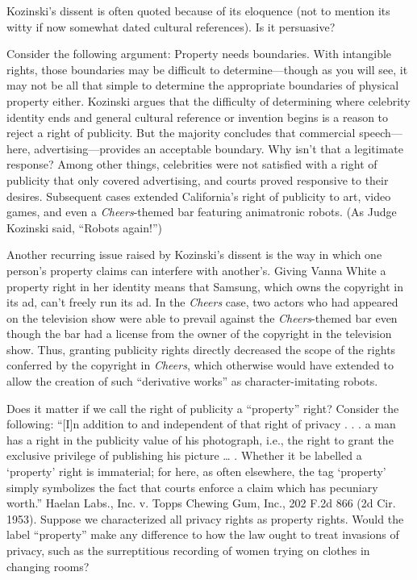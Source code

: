 \item Kozinski's dissent is often quoted because of its eloquence (not to
mention its witty if now somewhat dated cultural references).  Is it persuasive?

Consider the following argument: Property needs boundaries.  With intangible
rights, those boundaries may be difficult to determine---though as you will
see, it may not be all that simple to determine the appropriate boundaries of
physical property either.  Kozinski argues that the difficulty of determining
where celebrity identity ends and general cultural reference or invention
begins is a reason to reject a right of publicity.  But the majority concludes
that commercial speech---here, advertising---provides an acceptable boundary.
 Why isn't that a legitimate response?  Among other things, celebrities were
not satisfied with a right of publicity that only covered advertising, and
courts proved responsive to their desires.  Subsequent cases extended
California's right of publicity to art, video games, and even a
\textit{Cheers}{}-themed bar featuring animatronic robots.  (As Judge Kozinski
said, ``Robots again!'')  

\item Another recurring issue raised by Kozinski's dissent is the way in which
one person's property claims can interfere with another's.  Giving Vanna White a
property right in her identity means that Samsung, which owns the copyright in
its ad, can't freely run its ad.  In the \textit{Cheers} case, two actors who
had appeared on the television show were able to prevail against the
\textit{Cheers}{}-themed bar even though the bar had a license from the owner of
the copyright in the television show.  Thus, granting publicity rights directly
decreased the scope of the rights conferred by the copyright in \textit{Cheers},
which otherwise would have extended to allow the creation of such ``derivative
works'' as character-imitating robots.

\item Does it matter if we call the right of publicity a ``property'' right?
Consider the following: ``[I]n addition to and independent of that right of
privacy . . . a man has a right in the publicity value of his photograph, i.e.,
the right to grant the exclusive privilege of publishing his picture {\dots} .
Whether it be labelled a `property' right is immaterial; for here, as often
elsewhere, the tag `property' simply symbolizes the fact that courts enforce a
claim which has pecuniary worth.'' Haelan Labs., Inc. v. Topps Chewing Gum,
Inc., 202 F.2d 866 (2d Cir. 1953).  Suppose we characterized all privacy rights
as property rights.  Would the label ``property'' make any difference to how the
law ought to treat invasions of privacy, such as the surreptitious recording of
women trying on clothes in changing rooms?
